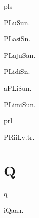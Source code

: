 \begin{multicols*}{2}
\begin{dictroot}{pl}{s}
\begin{dictentry}{PLuSu}{n.}
    \end{dictentry}
    \begin{dictentry}{PLasiS}{n.}
    \end{dictentry}
    \begin{dictentry}{PLajuSa}{n.}
    \end{dictentry}
    \begin{dictentry}{PLidiS}{n.}
    \end{dictentry}
    \begin{dictentry}{aPLiSu}{n.}
    \end{dictentry}
    \begin{dictentry}{PLimiSu}{n.}
    \end{dictentry}
\end{dictroot}

\begin{dictroot}{pr}{l}
    \begin{dictentry}{PRiiL}{v.tr.}
    \end{dictentry}
\end{dictroot}

\section*{Q}

\begin{dictroot}{q}{\bigglot}
    \begin{dictentry}{iQaa\bigglot}{n.}
    \end{dictentry}
\end{dictroot}


\end{multicols*}
